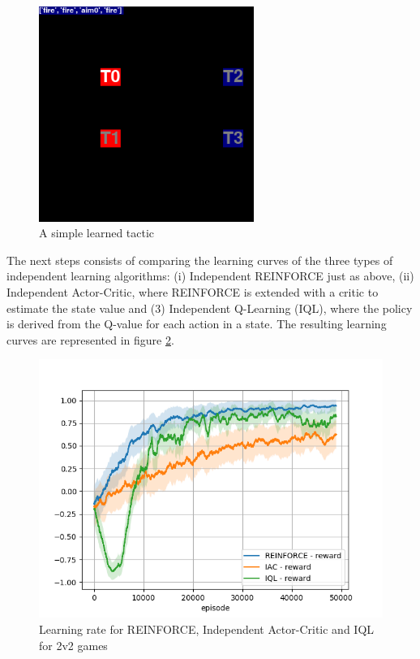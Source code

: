 \begin{figure}
\begin{minipage}{.5\textwidth}
\end{minipage}%
\begin{minipage}{.5\textwidth}
  \centering
  \includegraphics[width=7cm]{images/animation01/screenshot0-4.png}
\end{minipage}
\caption{A simple learned tactic}
\label{fig:simple_tactic01}
\end{figure}

The next steps consists of comparing the learning curves of the three types of independent learning algorithms: (i) Independent REINFORCE just as above, (ii) Independent Actor-Critic, where REINFORCE is extended with a critic to estimate the state value and (3) Independent Q-Learning (IQL), where the policy is derived from the Q-value for each action in a state. The resulting learning curves are represented in figure \ref{fig:compare_reward}.

\begin{figure}[htp]
    \centering
    \includegraphics[width=14cm]{images/experiment4/compare_reward.png}
    \caption{Learning rate for REINFORCE, Independent Actor-Critic and IQL for 2v2 games}
    \label{fig:compare_reward}
\end{figure}

